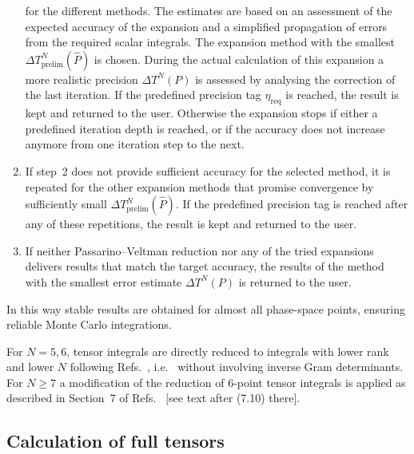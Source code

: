 \documentclass[preprint,sort&compress,12pt]{elsarticle}
\def\citeres#1{\mbox{Refs.~\cite{#1}}}
\def\ie{i.e.\ }
\begin{document}
\begin{sloppypar}
\begin{enumerate}
  for the different methods. The estimates
  are based on an assessment of the expected accuracy of the expansion
  and a simplified propagation of errors from the required scalar
  integrals.  The expansion method with the smallest $\Delta
  T^N_{\mathrm{prelim}}(\widehat{P})$ is chosen.
  During the actual calculation
  of this expansion a more realistic precision $\Delta T^N(P)$ is
  assessed by analysing the correction of the last iteration.  If the
  predefined precision tag $\eta_{\textrm{req}}$ is reached, the
  result is kept and returned to the user.  Otherwise the expansion
  stops if either a predefined iteration depth is reached, or if the
  accuracy does not increase anymore from one iteration step to the
  next.
\item
If step~2 does not provide sufficient accuracy for the selected method,
 it is repeated for the other expansion methods that promise
convergence by sufficiently small $\Delta T^N_{\mathrm{prelim}}(\widehat{P})$.
If the predefined precision tag is reached after any of these
repetitions, the result is kept and returned to the user.
\item
If neither Passarino--Veltman reduction nor any of
the tried expansions delivers results that match
the target accuracy, the results of the method with
the smallest error estimate $\Delta T^N(P)$ is
returned to the user.
\end{enumerate}
In this way stable results are obtained for almost all phase-space
points, 
ensuring reliable Monte Carlo integrations.
\end{sloppypar}

For $N=5,6$, tensor integrals are directly reduced to integrals with
lower rank and lower $N$ following
\citeres{Denner:2002ii,Denner:2005nn}, \ie 
without involving inverse Gram determinants. 
For $N\ge7$ a modification of the reduction of 6-point tensor
integrals is applied as described in Section~7 of \citeres{Denner:2005nn}
$[$see text after (7.10) there$]$.

\subsection{Calculation of full tensors}
\end{document}
